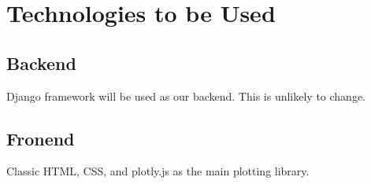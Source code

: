 \documentclass[a4paper,11pt]{article}
\begin{document}
\section{Technologies to be Used}
\subsection{Backend}
	Django framework will be used as our backend. This is unlikely to change.
\subsection{Fronend}
Classic HTML, CSS, and plotly.js as the main plotting library.
\end{document}
